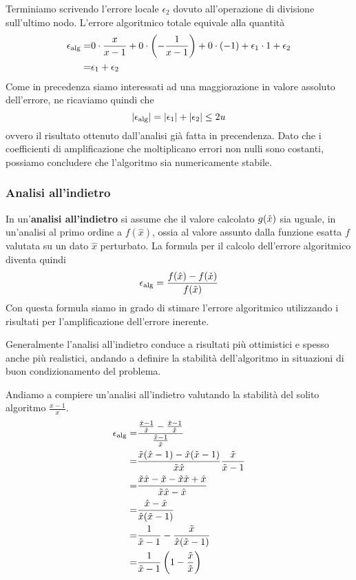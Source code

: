 \begin{example}
	Terminiamo scrivendo l'errore locale $\epsilon_2$ dovuto all'operazione di divisione sull'ultimo nodo. L'errore
	algoritmico totale equivale alla quantità
	\begin{align*}
		\epsilon_\text{alg} = & 0 \cdot \frac{x}{x-1} + 0 \cdot \left( -\frac{1}{x-1} \right) + 0 \cdot (-1) +
		\epsilon_1 \cdot 1 + \epsilon_2                                                          \\
		=       & \epsilon_1 + \epsilon_2
	\end{align*}
	Come in precedenza siamo interessati ad una maggiorazione in valore assoluto dell'errore, ne ricaviamo quindi
	che
	\[ |\epsilon_\text{alg}| = |\epsilon_1| + |\epsilon_2| \leq 2u \]
	ovvero il risultato ottenuto dall'analisi già fatta in precendenza. Dato che i coefficienti di amplificazione
	che moltiplicano errori non nulli sono costanti, possiamo concludere che l'algoritmo sia numericamente stabile.
\end{example}

\subsubsection{Analisi all'indietro}
In un'\textbf{analisi all'indietro} si assume che il valore calcolato $g(\tilde{x})$ sia uguale, in un'analisi al primo
ordine a $f(\hat{x})$, ossia al valore assunto dalla funzione esatta $f$ valutata su un dato $\hat{x}$ perturbato.
La formula per il calcolo dell'errore algoritmico diventa quindi
\[ \epsilon_\text{alg} = \frac{f(\hat{x}) - f(\tilde{x})}{f(\tilde{x})} \]
Con questa formula siamo in grado di stimare l'errore algoritmico utilizzando i risultati per l'amplificazione
dell'errore inerente.

Generalmente l'analisi all'indietro conduce a risultati più ottimistici e spesso anche più realistici, andando a
definire la stabilità dell'algoritmo in situazioni di buon condizionamento del problema.

\begin{example}
	Andiamo a compiere un'analisi all'indietro valutando la stabilità del solito algoritmo $\frac{x-1}{x}$.
	\begin{align*}
		\epsilon_\text{alg} = & \frac{\frac{\hat{x} - 1}{\hat{x}} - \frac{\tilde{x} - 1}{\tilde{x}}}{\frac{\tilde{x} - 1}{\tilde{x}}} \\
		=       & \frac{\tilde{x} (\hat{x} - 1) - \hat{x}(\tilde{x} - 1)}{\tilde{x} \hat{x}} \frac{\tilde{x}}{\tilde{x} - 1}  \\
		=       & \frac{\tilde{x} \hat{x} - \tilde{x} - \tilde{x} \hat{x} + \hat{x}}{\tilde{x} \hat{x} - \hat{x}}       \\
		=       & \frac{\hat{x} - \tilde{x}}{\hat{x}(\tilde{x} - 1)}                                        \\
		=       & \frac{1}{\tilde{x} - 1} - \frac{\tilde{x}}{\hat{x} (\tilde{x} - 1)}                             \\
		=       & \frac{1}{\tilde{x} - 1} \left( 1 - \frac{\tilde{x}}{\hat{x}} \right)
	\end{align*}
\end{example}
